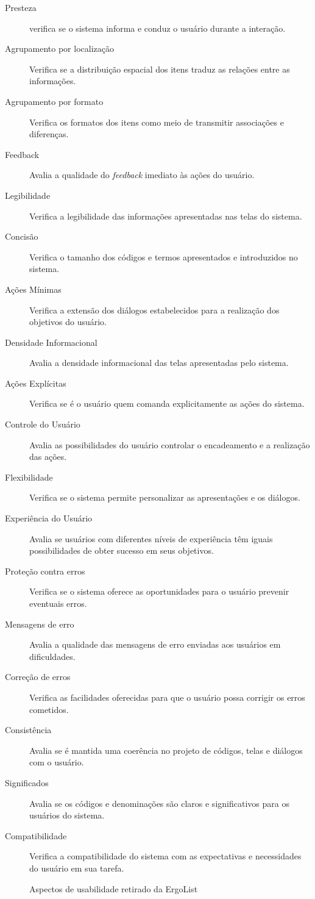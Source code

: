 \begin{description}
\item[Presteza]
verifica se o sistema informa e conduz o usuário durante a interação.
\item[Agrupamento por localização]
Verifica se a distribuição espacial dos itens traduz as relações entre as informações.
\item[Agrupamento por formato]
Verifica os formatos dos itens como meio de transmitir associações e diferenças.
\item[Feedback]
Avalia a qualidade do \textit{feedback} imediato às ações do usuário.
\item[Legibilidade]
Verifica a legibilidade das informações apresentadas nas telas do sistema.
\item[Concisão]
Verifica o tamanho dos códigos e termos apresentados e introduzidos no sistema.
\item[Ações Mínimas]
Verifica a extensão dos diálogos estabelecidos para a realização dos objetivos do usuário.
\item[Densidade Informacional]
Avalia a densidade informacional das telas apresentadas pelo sistema.
\item[Ações Explícitas]
Verifica se é o usuário quem comanda explicitamente as ações do sistema.
\item[Controle do Usuário]
Avalia as possibilidades do usuário controlar o encadeamento e a realização das ações.
\item[Flexibilidade]
Verifica se o sistema permite personalizar as apresentações e os diálogos.
\item[Experiência do Usuário]
Avalia se usuários com diferentes níveis de experiência têm iguais possibilidades de obter sucesso em seus objetivos.
\item[Proteção contra erros]
Verifica se o sistema oferece as oportunidades para o usuário prevenir eventuais erros.
\item[Mensagens de erro]
Avalia a qualidade das mensagens de erro enviadas aos usuários em dificuldades.
\item[Correção de erros]
Verifica as facilidades oferecidas para que o usuário possa corrigir os erros cometidos.
\item[Consistência]
Avalia se é mantida uma coerência no projeto de códigos, telas e diálogos com o usuário.
\item[Significados]
Avalia se os códigos e denominações são claros e significativos para os usuários do sistema.
\item[Compatibilidade]
Verifica a compatibilidade do sistema com as expectativas e necessidades do usuário em sua tarefa.
\begin{flushright}
Aspectos de usabilidade retirado da ErgoList ~\cite{ergolist2013}
\end{flushright}
\end{description}

